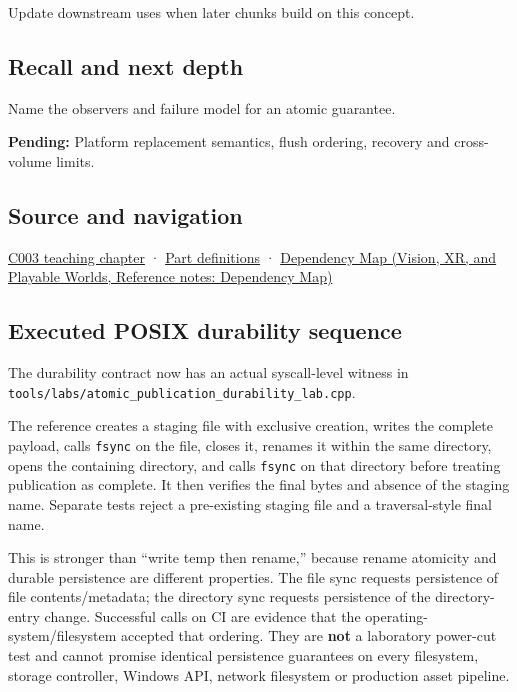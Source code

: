 \hypertarget{appendix-e89a8f290ef5-used-by}{}

Update downstream uses when later chunks build on this concept.

\subsection{Recall and next depth}\label{appendix-e89a8f290ef5-recall-and-next-depth}

\hypertarget{appendix-e89a8f290ef5-recall-and-next-depth}{}

Name the observers and failure model for an atomic guarantee.

\textbf{Pending:} Platform replacement semantics, flush ordering, recovery and cross-volume limits.

\subsection{Source and navigation}\label{appendix-e89a8f290ef5-source-and-navigation}

\hypertarget{appendix-e89a8f290ef5-source-and-navigation}{}

\hyperref[01-foundations-i-ch002-where-the-bytes-live]{C003 teaching chapter} · \hyperref[appendix-fd090d982a15-m003---parts-41-60]{Part definitions} · \href{../07-Vision-XR-and-Playable-Worlds/main.pdf\#nameddest=appendix-4ad47bdd269a}{Dependency Map (Vision, XR, and Playable Worlds, Reference notes: Dependency Map)}

\subsection{Executed POSIX durability sequence}\label{appendix-e89a8f290ef5-executed-posix-durability-sequence}

\hypertarget{appendix-e89a8f290ef5-executed-posix-durability-sequence}{}

The durability contract now has an actual syscall-level witness in \texttt{tools/labs/atomic\_publication\_durability\_lab.cpp}.

The reference creates a staging file with exclusive creation, writes the complete payload, calls \texttt{fsync} on the file, closes it, renames it within the same directory, opens the containing directory, and calls \texttt{fsync} on that directory before treating publication as complete. It then verifies the final bytes and absence of the staging name. Separate tests reject a pre-existing staging file and a traversal-style final name.

This is stronger than ``write temp then rename,'' because rename atomicity and durable persistence are different properties. The file sync requests persistence of file contents/metadata; the directory sync requests persistence of the directory-entry change. Successful calls on CI are evidence that the operating-system/filesystem accepted that ordering. They are \textbf{not} a laboratory power-cut test and cannot promise identical persistence guarantees on every filesystem, storage controller, Windows API, network filesystem or production asset pipeline.
